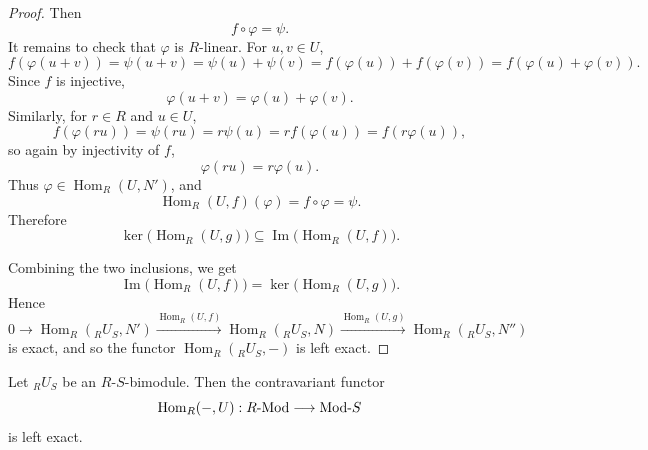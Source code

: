 \begin{proof}
    Then
    \[
        f\circ \varphi=\psi.
    \]
    It remains to check that $\varphi$ is $R$-linear. For $u,v\in U$,
    \[
        f(\varphi(u+v))=\psi(u+v)=\psi(u)+\psi(v)=f(\varphi(u))+f(\varphi(v))
        =f(\varphi(u)+\varphi(v)).
    \]
    Since $f$ is injective,
    \[
        \varphi(u+v)=\varphi(u)+\varphi(v).
    \]
    Similarly, for $r\in R$ and $u\in U$,
    \[
        f(\varphi(ru))=\psi(ru)=r\psi(u)=rf(\varphi(u))=f(r\varphi(u)),
    \]
    so again by injectivity of $f$,
    \[
        \varphi(ru)=r\varphi(u).
    \]
    Thus $\varphi\in \operatorname{Hom}_R(U,N')$, and
    \[
        \operatorname{Hom}_R(U,f)(\varphi)=f\circ \varphi=\psi.
    \]
    Therefore
    \[
        \ker\bigl(\operatorname{Hom}_R(U,g)\bigr)
        \subseteq
        \operatorname{Im}\bigl(\operatorname{Hom}_R(U,f)\bigr).
    \]

    Combining the two inclusions, we get
    \[
        \operatorname{Im}\bigl(\operatorname{Hom}_R(U,f)\bigr)
        =
        \ker\bigl(\operatorname{Hom}_R(U,g)\bigr).
    \]
    Hence
    \[
        0\longrightarrow \operatorname{Hom}_R({}_R U_S,N')
        \xrightarrow{\operatorname{Hom}_R(U,f)}
        \operatorname{Hom}_R({}_R U_S,N)
        \xrightarrow{\operatorname{Hom}_R(U,g)}
        \operatorname{Hom}_R({}_R U_S,N'')
    \]
    is exact, and so the functor $\operatorname{Hom}_R({}_R U_S,-)$ is left exact.
\end{proof}

\begin{theorem}
    Let ${}_R U_S$ be an $R$-$S$-bimodule. Then the contravariant functor
    \[
        \mathrm{Hom}_R(-,U): R\text{-}\mathrm{Mod}\longrightarrow \mathrm{Mod}\text{-}S
    \]
    is left exact.
\end{theorem}

